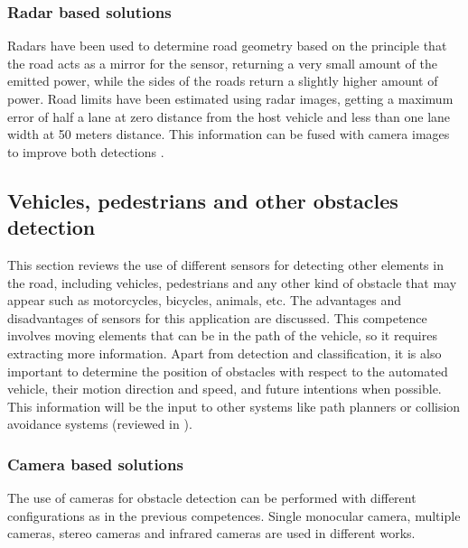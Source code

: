 \subsubsection{Radar based solutions}
Radars have been used to determine road geometry based on the principle that the
road acts as a mirror for the sensor, returning a very small amount of the 
emitted power, while the sides of the roads return a slightly higher 
amount of power. Road limits have been estimated using radar images, getting a 
maximum error of half a lane at zero distance from the host vehicle and less 
than one lane width at 50 meters distance. This information can be fused with
camera images to improve both detections 
\cite{kaliyaperumal2001algorithm, ma2000simultaneous, Janda2013}.

\subsection{Vehicles, pedestrians and other obstacles detection}
This section reviews the use of different sensors for detecting other elements 
in the road, including vehicles, pedestrians and any other kind of obstacle 
that may appear such as motorcycles, bicycles, animals, etc. 
The advantages and disadvantages of sensors for this application are discussed.
This competence involves moving elements that can be in the path of the 
vehicle, so it requires extracting more information. Apart from detection and 
classification, it is also important to determine the position of obstacles 
with 
respect to the automated vehicle, their motion direction and speed, and future 
intentions when possible. 
This information will be the input to other systems like path planners 
or collision avoidance systems (reviewed in \cite{mukhtar2015vehicle}).

\subsubsection{Camera based solutions}
The use of cameras for obstacle detection can be performed with different 
configurations as in the previous competences. Single monocular 
camera, multiple cameras, stereo cameras and infrared cameras are used in 
different works.

